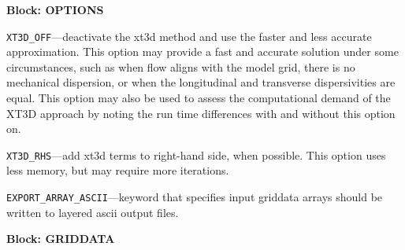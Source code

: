 
\item \textbf{Block: OPTIONS}

\begin{description}
\item \texttt{XT3D\_OFF}---deactivate the xt3d method and use the faster and less accurate approximation.  This option may provide a fast and accurate solution under some circumstances, such as when flow aligns with the model grid, there is no mechanical dispersion, or when the longitudinal and transverse dispersivities are equal.  This option may also be used to assess the computational demand of the XT3D approach by noting the run time differences with and without this option on.

\item \texttt{XT3D\_RHS}---add xt3d terms to right-hand side, when possible.  This option uses less memory, but may require more iterations.

\item \texttt{EXPORT\_ARRAY\_ASCII}---keyword that specifies input griddata arrays should be written to layered ascii output files.

\end{description}
\item \textbf{Block: GRIDDATA}

